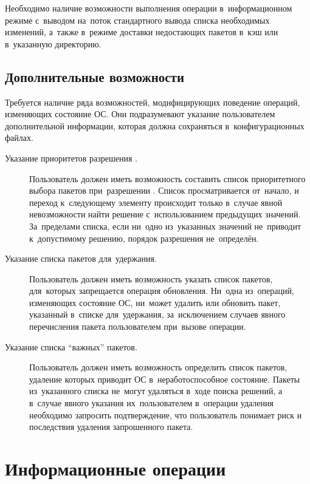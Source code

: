 Необходимо наличие возможности выполнения операции в~информационном режиме с~выводом на~поток  стандартного вывода списка необходимых изменений,
а~также в~режиме доставки недостающих пакетов в~кэш или в~указанную директорию.

\subsection{Дополнительные возможности}
\label{advfeatures}

Требуется наличие ряда возможностей, модифицирующих поведение операций, изменяющих состояние ОС.
Они подразумевают указание пользователем дополнительной информации,
которая должна сохраняться в~конфигурационных файлах. 

\begin{description}

\item[Указание приоритетов разрешения .]
Пользователь должен иметь возможность составить список приоритетного выбора пакетов при~разрешении .
Список просматривается от~начало, и переход к~следующему элементу происходит только в~случае явной невозможности найти решение с~использованием предыдущих значений.
За~пределами списка, если ни~одно из~указанных значений не~приводит к~допустимому решению,
порядок разрешения  не~определён.

\item[Указание списка пакетов для~удержания.]
Пользователь должен иметь возможность указать список пакетов, для~которых запрещается операция обновления.
Ни~одна из~операций, изменяющих состояние ОС, ни~может удалить или обновить пакет, указанный в~списке для~удержания,
за~исключением случаев явного перечисления пакета пользователем при~вызове операции.

\item[Указание списка ``важных'' пакетов.]
Пользователь должен иметь возможность определить список пакетов, 
удаление которых приводит ОС в~неработоспособное состояние.
Пакеты из~указанного списка не~могут удаляться в~ходе поиска решений, а в~случае явного указания их~пользователем в~операции удаления
необходимо запросить подтверждение, что пользователь понимает риск и последствия удаления запрошенного пакета.

\end{description}

\section{Информационные операции}

